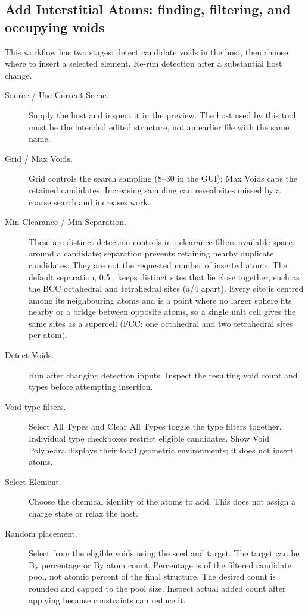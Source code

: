 \subsection{Add Interstitial Atoms: finding, filtering, and occupying voids}
This workflow has two stages: detect candidate voids in the host, then choose where to insert a selected element. Re-run detection after a substantial host change.
\begin{description}
\item[Source / Use Current Scene.] Supply the host and inspect it in the preview. The host used by this tool must be the intended edited structure, not an earlier file with the same name.
\item[Grid / Max Voids.] Grid controls the search sampling (8--30 in the GUI); Max Voids caps the retained candidates. Increasing sampling can reveal sites missed by a coarse search and increases work.
\item[Min Clearance / Min Separation.] These are distinct detection controls in \angstrom: clearance filters available space around a candidate; separation prevents retaining nearby duplicate candidates. They are not the requested number of inserted atoms. The default separation, 0.5 \angstrom, keeps distinct sites that lie close together, such as the BCC octahedral and tetrahedral sites (a/4 apart). Every site is centred among its neighbouring atoms and is a point where no larger sphere fits nearby or a bridge between opposite atoms, so a single unit cell gives the same sites as a supercell (FCC: one octahedral and two tetrahedral sites per atom).
\item[Detect Voids.] Run after changing detection inputs. Inspect the resulting void count and types before attempting insertion.
\item[Void type filters.] Select All Types and Clear All Types toggle the type filters together. Individual type checkboxes restrict eligible candidates. Show Void Polyhedra displays their local geometric environments; it does not insert atoms.
\item[Select Element.] Choose the chemical identity of the atoms to add. This does not assign a charge state or relax the host.
\item[Random placement.] Select from the eligible voids using the seed and target. The target can be By percentage or By atom count. Percentage is of the filtered candidate pool, not atomic percent of the final structure. The desired count is rounded and capped to the pool size. Inspect actual added count after applying because constraints can reduce it.

\end{description}
